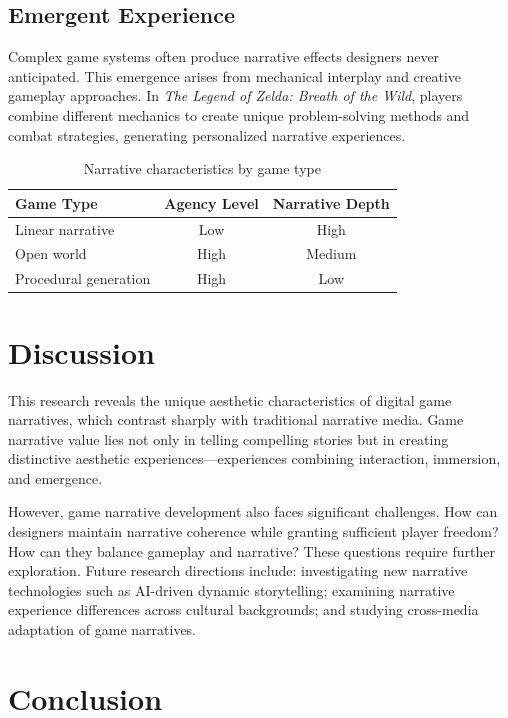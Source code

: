 \documentclass[red,fullpaper]{ludusofficial}  %
\begin{document}
\subsection{Emergent Experience}

Complex game systems often produce narrative effects designers never anticipated. This emergence arises from mechanical interplay and creative gameplay approaches. In \textit{The Legend of Zelda: Breath of the Wild}, players combine different mechanics to create unique problem-solving methods and combat strategies, generating personalized narrative experiences.

\begin{table}[h!]
\centering
\caption{Narrative characteristics by game type}
\label{tab:game-types}
\begin{tabular}{lcc}
\hline
\textbf{Game Type} & \textbf{Agency Level} & \textbf{Narrative Depth} \\
\hline
Linear narrative & Low & High \\
Open world & High & Medium \\
Procedural generation & High & Low \\
\hline
\end{tabular}
\end{table}

\section{Discussion}

This research reveals the unique aesthetic characteristics of digital game narratives, which contrast sharply with traditional narrative media. Game narrative value lies not only in telling compelling stories but in creating distinctive aesthetic experiences—experiences combining interaction, immersion, and emergence.

However, game narrative development also faces significant challenges. How can designers maintain narrative coherence while granting sufficient player freedom? How can they balance gameplay and narrative? These questions require further exploration. Future research directions include: investigating new narrative technologies such as AI-driven dynamic storytelling; examining narrative experience differences across cultural backgrounds; and studying cross-media adaptation of game narratives.

\section{Conclusion}
\end{document}
